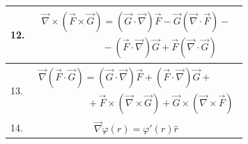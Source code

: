 \begin{table}
\begin{tabular}{|l|c|}
\hline
12.&$\displaystyle\begin{array}{l}\vec{\nabla}\times\left( \vec{F}\times \vec{G}\right)=\left(\vec{G}\cdot \vec{\nabla}\right)\vec{F}-\vec{G}\left(\vec{\nabla}\cdot \vec{F}\right)-\\ ~\qquad\qquad\qquad-\left(\vec{F}\cdot \vec{\nabla}\right)\vec{G}+\vec{F}\left(\vec{\nabla}\cdot \vec{G}\right)\end{array}$\\
\hline
13.&$\displaystyle\begin{array}{l}\vec{\nabla}\left( \vec{F}\cdot \vec{G}\right)=\left(\vec{G}\cdot \vec{\nabla}\right)\vec{F}+\left(\vec{F}\cdot \vec{\nabla}\right)\vec{G}+\\\qquad\qquad\quad+\vec{F}\times\left(\vec{\nabla} \times \vec{G}\right)+\vec{G}\times\left(\vec{\nabla} \times \vec{F}\right)\end{array}$\\
\hline
14.&$\vec{\nabla}\varphi(r) = \varphi'(r)\hat{r}$\\
\hline
\end{tabular}
\end{table}

